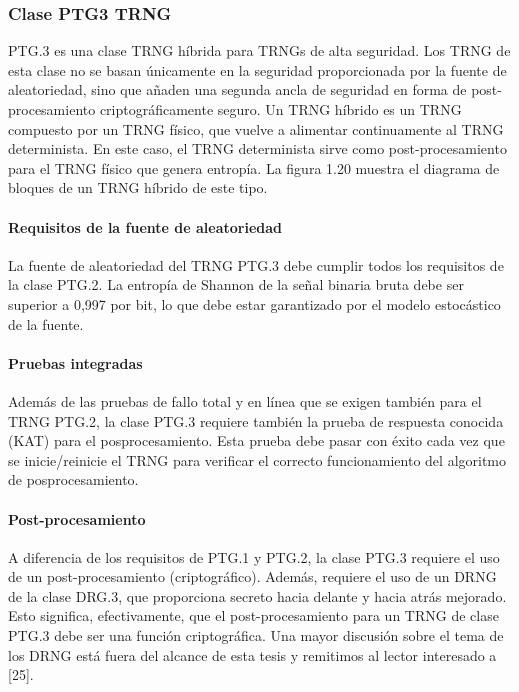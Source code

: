 	
	\subsubsection{Clase PTG3 TRNG}
	
		PTG.3 es una clase TRNG híbrida para TRNGs de alta seguridad. Los TRNG de esta clase no se basan únicamente en la seguridad proporcionada por la fuente de aleatoriedad, sino que añaden una segunda ancla de seguridad en forma de post-procesamiento criptográficamente seguro. Un TRNG híbrido es un TRNG compuesto por un TRNG físico, que vuelve a alimentar continuamente al TRNG determinista. En este caso, el TRNG determinista sirve como post-procesamiento para el TRNG físico que genera entropía. La figura 1.20 muestra el diagrama de bloques de un TRNG híbrido de este tipo.
	
	\paragraph{Requisitos de la fuente de aleatoriedad\\}
	
		La fuente de aleatoriedad del TRNG PTG.3 debe cumplir todos los requisitos de la clase PTG.2. La entropía de Shannon de la señal binaria bruta debe ser superior a 0,997 por bit, lo que debe estar garantizado por el modelo estocástico de la fuente.
	\paragraph{Pruebas integradas\\}
	
		Además de las pruebas de fallo total y en línea que se exigen también para el TRNG PTG.2, la clase PTG.3 requiere también la prueba de respuesta conocida (KAT) para el posprocesamiento. Esta prueba debe pasar con éxito cada vez que se inicie/reinicie el TRNG para verificar el correcto funcionamiento del algoritmo de posprocesamiento.
		
	\paragraph{Post-procesamiento\\}
	
	A diferencia de los requisitos de PTG.1 y PTG.2, la clase PTG.3 requiere el uso de un post-procesamiento (criptográfico). Además, requiere el uso de un DRNG de la clase DRG.3, que proporciona secreto hacia delante y hacia atrás mejorado. Esto significa, efectivamente, que el post-procesamiento para un TRNG de clase PTG.3 debe ser una función criptográfica. Una mayor discusión sobre el tema de los DRNG está fuera del alcance de esta tesis y remitimos al lector interesado a [25].
	
